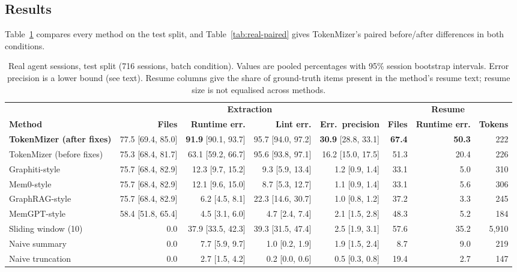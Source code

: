 \documentclass[journal]{IEEEtran}
\begin{document}
\subsection{Results}
\label{sec:real-results}

Table~\ref{tab:real-main} compares every method on the test
split, and Table~\ref{tab:real-paired} gives TokenMizer's paired
before/after differences in both conditions.

\begin{table}[t]
  \centering
  \caption{Real agent sessions, test split (716 sessions, batch
  condition). Values are pooled percentages with 95\% session
  bootstrap intervals. Error precision is a lower bound (see
  text). Resume columns give the share of ground-truth items
  present in the method's resume text; resume size is not
  equalised across methods.}
  \label{tab:real-main}
  \renewcommand{\arraystretch}{1.15}
  \footnotesize
  \setlength{\tabcolsep}{4pt}
  \begin{tabular}{@{}lrrrrrrr@{}}
    \toprule
    & \multicolumn{4}{c}{\textbf{Extraction}} & \multicolumn{3}{c}{\textbf{Resume}} \\
    \cmidrule(lr){2-5}\cmidrule(l){6-8}
    \textbf{Method} & \textbf{Files} & \textbf{Runtime err.} &
    \textbf{Lint err.} & \textbf{Err.\ precision} &
    \textbf{Files} & \textbf{Runtime err.} & \textbf{Tokens} \\
    \midrule
    \rowcolor{rowours}
    \textbf{TokenMizer (after fixes)} & 77.5 [69.4, 85.0] & \textbf{91.9} [90.1, 93.7] & 95.7 [94.0, 97.2] & \textbf{30.9} [28.8, 33.1] & \textbf{67.4} & \textbf{50.3} & 222 \\
    TokenMizer (before fixes) & 75.3 [68.4, 81.7] & 63.1 [59.2, 66.7] & 95.6 [93.8, 97.1] & 16.2 [15.0, 17.5] & 51.3 & 20.4 & 226 \\
    Graphiti-style   & 75.7 [68.4, 82.9] & 12.3 [9.7, 15.2]  & 9.3 [5.9, 13.4]   & 1.2 [0.9, 1.4] & 33.1 & 5.0  & 310 \\
    Mem0-style       & 75.7 [68.4, 82.9] & 12.1 [9.6, 15.0]  & 8.7 [5.3, 12.7]   & 1.1 [0.9, 1.4] & 33.1 & 5.6  & 306 \\
    GraphRAG-style   & 75.7 [68.4, 82.9] & 6.2 [4.5, 8.1]    & 22.3 [14.6, 30.7] & 1.0 [0.8, 1.2] & 37.2 & 3.3  & 245 \\
    MemGPT-style     & 58.4 [51.8, 65.4] & 4.5 [3.1, 6.0]    & 4.7 [2.4, 7.4]    & 2.1 [1.5, 2.8] & 48.3 & 5.2  & 184 \\
    Sliding window (10) & 0.0 & 37.9 [33.5, 42.3] & 39.3 [31.5, 47.4] & 2.5 [1.9, 3.1] & 57.6 & 35.2 & 5{,}910 \\
    Naive summary    & 0.0 & 7.7 [5.9, 9.7] & 1.0 [0.2, 1.9] & 1.9 [1.5, 2.4] & 8.7 & 9.0 & 219 \\
    Naive truncation & 0.0 & 2.7 [1.5, 4.2] & 0.2 [0.0, 0.6] & 0.5 [0.3, 0.8] & 19.4 & 2.7 & 147 \\
    \bottomrule
  \end{tabular}
\end{table}
\end{document}
